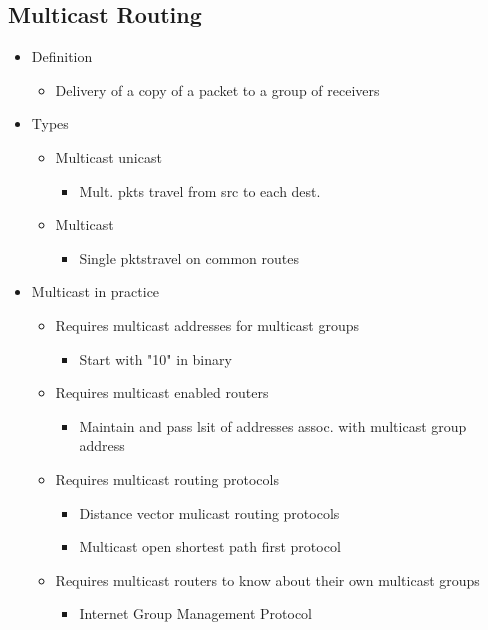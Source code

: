 \documentclass[a4paper]{article}
\begin{document}
\subsection{Multicast Routing}
\begin{itemize}
	\item Definition
	\begin{itemize}
		\item Delivery of a copy of a packet to a group of receivers
	\end{itemize}
	\item Types
	\begin{itemize}
		\item Multicast unicast
		\begin{itemize}
			\item Mult. pkts travel from src to each dest.
		\end{itemize}
		\item Multicast
		\begin{itemize}
			\item Single pktstravel on common routes
		\end{itemize}
	\end{itemize}
	\item Multicast in practice
	\begin{itemize}
		\item Requires multicast addresses for multicast groups
		\begin{itemize}
			\item Start with "10" in binary
		\end{itemize}
		\item Requires multicast enabled routers
		\begin{itemize}
			\item Maintain and pass lsit of addresses assoc. with
				multicast group address
		\end{itemize}
		\item Requires multicast routing protocols
		\begin{itemize}
			\item Distance vector mulicast routing protocols
			\item Multicast open shortest path first protocol
		\end{itemize}
		\item Requires multicast routers to know about their own
			multicast groups
		\begin{itemize}
			\item Internet Group Management Protocol
		\end{itemize}
	\end{itemize}
\end{itemize}
\end{document}
